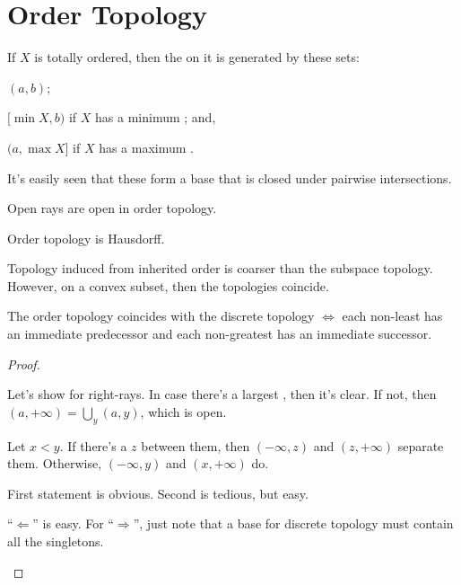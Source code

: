 	


\section{Order Topology}\label{SEC: order topo}

	If $X$ is totally ordered, then the  on it is generated by these sets:
	\begin{rmklist}
		\item $(a, b)$;
		\item $[\min X, b)$ if $X$ has a minimum \elt; and,
		\item $(a, \max X]$ if $X$ has a maximum \elt.
	\end{rmklist}
	It's easily seen that these form a base that is closed under pairwise intersections.

	\begin{lem}\label{LEM: triv things on order topo}
		\leavevmode
		\begin{mylist}
			\item Open rays are open in order topology.
			\item Order topology is Hausdorff.
			\item\label{LEMiii: triv things on order topo} Topology induced from inherited order is coarser than the subspace topology. However, on a convex subset, then the topologies coincide.
			
			\item\label{LEMiv: triv things on order topo} The order topology coincides with the discrete topology $\iff$ each non-least \elt has an immediate predecessor and each non-greatest \elt has an immediate successor.
		\end{mylist}
	\end{lem}
	
	\begin{proof}
		\begin{mylist}
			\item Let's show for right-rays. In case there's a largest \elt, then it's clear. If not, then $(a, +\infty) = \bigcup_y (a, y)$, which is open.
			
			\item Let $x < y$. If there's a $z$ between them, then $(-\infty, z)$ and $(z, +\infty)$ separate them. Otherwise, $(-\infty, y)$ and $(x, +\infty)$ do.
			
			\item First statement is obvious. Second is tedious, but easy.
			
			\item ``$\Leftarrow$'' is easy. For ``$\Rightarrow$'', just note that a base for discrete topology must contain all the singletons.
			\qedhere
		\end{mylist}
	\end{proof}
	
